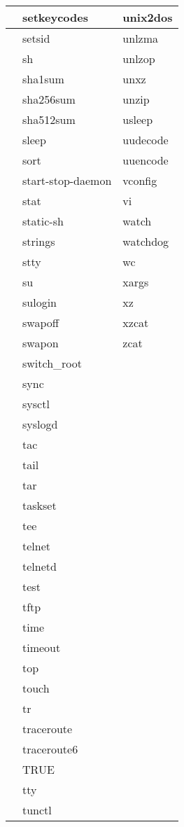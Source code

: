 \begin{longtable}{llp{50mm}}
 & setkeycodes & unix2dos \\ \hline
 & setsid & unlzma \\ \hline
 & sh & unlzop \\ \hline
 & sha1sum & unxz \\ \hline
 & sha256sum & unzip \\ \hline
 & sha512sum & usleep \\ \hline
 & sleep & uudecode \\ \hline
 & sort & uuencode \\ \hline
 & start-stop-daemon & vconfig \\ \hline
 & stat & vi \\ \hline
 & static-sh & watch \\ \hline
 & strings & watchdog \\ \hline
 & stty & wc \\ \hline
 & su & xargs \\ \hline
 & sulogin & xz \\ \hline
 & swapoff & xzcat \\ \hline
 & swapon & zcat \\ \hline
 & switch\_root &  \\ \hline
 & sync &  \\ \hline
 & sysctl &  \\ \hline
 & syslogd &  \\ \hline
 & tac &  \\ \hline
 & tail &  \\ \hline
 & tar &  \\ \hline
 & taskset &  \\ \hline
 & tee &  \\ \hline
 & telnet &  \\ \hline
 & telnetd &  \\ \hline
 & test &  \\ \hline
 & tftp &  \\ \hline
 & time &  \\ \hline
 & timeout &  \\ \hline
 & top &  \\ \hline
 & touch &  \\ \hline
 & tr &  \\ \hline
 & traceroute &  \\ \hline
 & traceroute6 &  \\ \hline
 & TRUE &  \\ \hline
 & tty &  \\ \hline
 & tunctl &  \\ \hline

\end{longtable}
